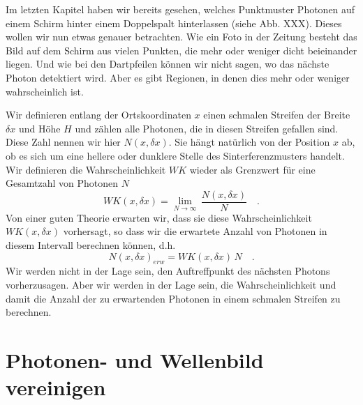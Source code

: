 Im letzten Kapitel haben wir bereits gesehen, welches Punktmuster Photonen auf einem Schirm hinter einem Doppelspalt hinterlassen (siehe Abb. XXX). Dieses wollen wir nun etwas genauer betrachten. Wie ein Foto in der Zeitung besteht das Bild auf dem Schirm aus vielen Punkten, die mehr oder weniger dicht beieinander liegen. Und wie bei den Dartpfeilen können wir nicht sagen, wo das nächste Photon detektiert wird. Aber es gibt Regionen, in denen dies mehr oder weniger wahrscheinlich ist.

Wir definieren entlang der Ortskoordinaten $x$ einen schmalen Streifen der Breite $\delta x$ und Höhe $H$ und zählen alle Photonen, die in diesen Streifen gefallen sind. Diese Zahl nennen wir hier $N(x, \delta x)$. Sie hängt natürlich von der Position $x$ ab, ob es sich um eine hellere oder dunklere Stelle des Sinterferenzmusters handelt. Wir definieren die Wahrscheinlichkeit $WK$ wieder als Grenzwert für eine Gesamtzahl von Photonen $N$
\begin{equation}
    WK(x, \delta x) = \lim_{N \rightarrow \infty} \, \frac{N(x, \delta x)}{N} \quad .
\end{equation}
Von einer guten Theorie erwarten wir, dass sie diese Wahrscheinlichkeit $WK(x, \delta x)$ vorhersagt, so dass wir die erwartete Anzahl von Photonen in diesem Intervall berechnen können, d.h. 
\begin{equation}
    N(x, \delta x)_{ erw} = WK(x, \delta x) \, N \quad .
\end{equation}
Wir werden nicht in der Lage sein, den Auftreffpunkt des nächsten Photons vorherzusagen. Aber wir werden in der Lage sein, die Wahrscheinlichkeit und damit die Anzahl der zu erwartenden Photonen in einem schmalen Streifen zu berechnen.


\section{Photonen- und Wellenbild vereinigen}

